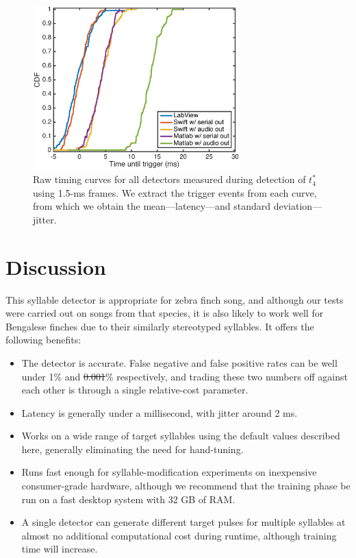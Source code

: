 \documentclass[10pt,letterpaper]{article}
\providecommand{\DIFaddtex}[1]{{\protect\color{blue}\uwave{#1}}} %
\providecommand{\DIFdeltex}[1]{{\protect\color{red}\sout{#1}}}                      %
\providecommand{\DIFaddbegin}{} %
\providecommand{\DIFaddend}{} %
\providecommand{\DIFdelbegin}{} %
\providecommand{\DIFdelend}{} %
\providecommand{\DIFaddFL}[1]{\DIFadd{#1}} %
\providecommand{\DIFaddbeginFL}{} %
\providecommand{\DIFaddendFL}{} %
\providecommand{\DIFadd}[1]{\texorpdfstring{\DIFaddtex{#1}}{#1}} %
\providecommand{\DIFdel}[1]{\texorpdfstring{\DIFdeltex{#1}}{}} %
\newcommand{\DIFscaledelfig}{0.5}
\newlength{\DIFdelgraphicswidth} %
\newlength{\DIFdelgraphicsheight} %
\newcommand{\DIFaddincludegraphics}[2][]{{\color{blue}\fbox{\DIFOincludegraphics[#1]{#2}}}} %
\newcommand{\DIFdelincludegraphics}[2][]{%
\sbox{\DIFdelgraphicsbox}{\DIFOincludegraphics[#1]{#2}}%
\settoboxwidth{\DIFdelgraphicswidth}{\DIFdelgraphicsbox} %
\settoboxtotalheight{\DIFdelgraphicsheight}{\DIFdelgraphicsbox} %
\scalebox{\DIFscaledelfig}{%
\parbox[b]{\DIFdelgraphicswidth}{\usebox{\DIFdelgraphicsbox}\\[-\baselineskip] \rule{\DIFdelgraphicswidth}{0em}}\llap{\resizebox{\DIFdelgraphicswidth}{\DIFdelgraphicsheight}{%
\setlength{\unitlength}{\DIFdelgraphicswidth}%
\begin{picture}(1,1)%
\thicklines\linethickness{2pt} %
{\color[rgb]{1,0,0}\put(0,0){\framebox(1,1){}}}%
{\color[rgb]{1,0,0}\put(0,0){\line( 1,1){1}}}%
{\color[rgb]{1,0,0}\put(0,1){\line(1,-1){1}}}%
\end{picture}%
}\hspace*{3pt}}} %
} %
\DeclareRobustCommand{\DIFaddbegin}{\DIFOaddbegin \let\includegraphics\DIFaddincludegraphics} %
\DeclareRobustCommand{\DIFaddend}{\DIFOaddend \let\includegraphics\DIFOincludegraphics} %
\DeclareRobustCommand{\DIFdelbegin}{\DIFOdelbegin \let\includegraphics\DIFdelincludegraphics} %
\DeclareRobustCommand{\DIFdelend}{\DIFOaddend \let\includegraphics\DIFOincludegraphics} %
\DeclareRobustCommand{\DIFaddbeginFL}{\DIFOaddbeginFL \let\includegraphics\DIFaddincludegraphics} %
\DeclareRobustCommand{\DIFaddendFL}{\DIFOaddendFL \let\includegraphics\DIFOincludegraphics} %
\begin{document}
\begin{figure}
  \begin{center}
    \includegraphics[width=8cm]{Fig7}
  \end{center}
  \caption{Raw timing curves for all detectors measured during
    detection of \DIFaddbeginFL \DIFaddFL{lny64's }\DIFaddendFL $t^*_4$ using 1.5-ms frames.  We extract the trigger events from each curve, from which we obtain the mean---latency---and
    standard deviation---jitter.}
  \label{fig:timing}
\end{figure}


\section{Discussion}
\label{sec:conclusion}

This syllable detector is appropriate for zebra finch song, and
although our tests were carried out on songs from that species, it is
also likely to work well for Bengalese finches due to their similarly stereotyped syllables.  It offers the
following benefits:
\begin{itemize}
\item The detector is accurate. False negative and false positive
  rates can be well under 1\% and \DIFdelbegin \DIFdel{0.001}\DIFdelend \DIFaddbegin \DIFadd{0.005}\DIFaddend \% respectively, and trading
  these two numbers off against each other is through a single
  relative-cost parameter.
\item Latency is generally under a millisecond, with jitter around 2
  ms.
\item Works on a wide range of target syllables using the default
  values described here, generally eliminating the need for
  hand-tuning.
\item Runs fast enough for syllable-modification experiments on
  inexpensive consumer-grade hardware, although we recommend that the
  training phase be run on a fast desktop system with 32 GB of RAM.
\item A single detector can generate different target pulses for
  multiple syllables at almost no additional computational cost during
  runtime, although training time will increase.
\end{itemize}
\end{document}
